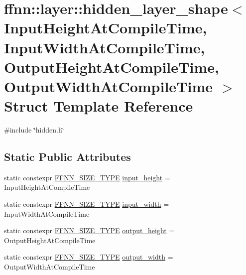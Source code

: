 \hypertarget{structffnn_1_1layer_1_1hidden__layer__shape}{\section{ffnn\-:\-:layer\-:\-:hidden\-\_\-layer\-\_\-shape$<$ Input\-Height\-At\-Compile\-Time, Input\-Width\-At\-Compile\-Time, Output\-Height\-At\-Compile\-Time, Output\-Width\-At\-Compile\-Time $>$ Struct Template Reference}
\label{structffnn_1_1layer_1_1hidden__layer__shape}
}


{\ttfamily \#include \char`\"{}hidden.\-h\char`\"{}}

\subsection*{Static Public Attributes}
\begin{DoxyCompactItemize}
\item 
static constexpr \hyperlink{global_8h_aab5a5a098c5bf31f4176f4a141d2ef65}{F\-F\-N\-N\-\_\-\-S\-I\-Z\-E\-\_\-\-T\-Y\-P\-E} \hyperlink{structffnn_1_1layer_1_1hidden__layer__shape_a8a49644e6568f49b4e25537a4fe3ec48}{input\-\_\-height} = Input\-Height\-At\-Compile\-Time
\item 
static constexpr \hyperlink{global_8h_aab5a5a098c5bf31f4176f4a141d2ef65}{F\-F\-N\-N\-\_\-\-S\-I\-Z\-E\-\_\-\-T\-Y\-P\-E} \hyperlink{structffnn_1_1layer_1_1hidden__layer__shape_ae46937b13b70edec57e4d629b43c8ef8}{input\-\_\-width} = Input\-Width\-At\-Compile\-Time
\item 
static constexpr \hyperlink{global_8h_aab5a5a098c5bf31f4176f4a141d2ef65}{F\-F\-N\-N\-\_\-\-S\-I\-Z\-E\-\_\-\-T\-Y\-P\-E} \hyperlink{structffnn_1_1layer_1_1hidden__layer__shape_a5ad34d7a50c5a29c33d67e3b310a9ea0}{output\-\_\-height} = Output\-Height\-At\-Compile\-Time
\item 
static constexpr \hyperlink{global_8h_aab5a5a098c5bf31f4176f4a141d2ef65}{F\-F\-N\-N\-\_\-\-S\-I\-Z\-E\-\_\-\-T\-Y\-P\-E} \hyperlink{structffnn_1_1layer_1_1hidden__layer__shape_a7ed9a65ec3fe465360015faa70306067}{output\-\_\-width} = Output\-Width\-At\-Compile\-Time
\end{DoxyCompactItemize}


